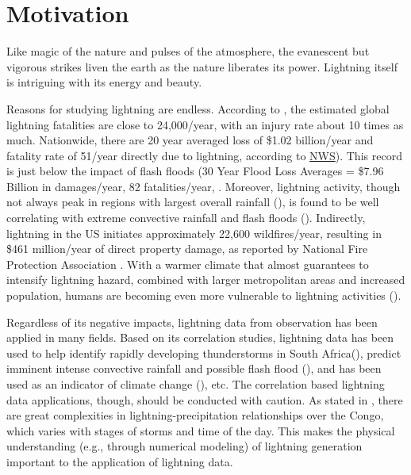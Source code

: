  
\chapter{Motivation}
\resetfootnote %

Like magic of the nature and pulses of the atmosphere, the evanescent but vigorous strikes liven the earth as the nature liberates its power. Lightning itself is intriguing with its energy and beauty. 

Reasons for studying lightning are endless. According to \cite{holle2016number}, the estimated global lightning fatalities are close to 24,000/year, with an injury rate about 10 times as much. Nationwide, there are 20 year averaged loss  of \$1.02 billion/year and fatality rate of 51/year directly due to lightning, according to \href{https://www.weather.gov/safety/lightning-fatalities}{NWS}). This record is just below the impact of flash floods (30 Year Flood Loss Averages = \$7.96 Billion in damages/year, 82 fatalities/year, \cite{nws2018}. Moreover, lightning activity, though not always peak in regions with largest overall rainfall (\cite{holle2016lightning}), is found to be well correlating with extreme convective rainfall and flash floods (\cite{price2011using,lynn2010prediction,soula2001some,carte1977lightning,tapia1998estimation}). Indirectly, lightning in the US initiates approximately 22,600 wildfires/year, resulting in \$461 million/year of direct property damage, as reported by National Fire Protection Association \cite{ahrens2013lightning}. With a warmer climate that almost guarantees to intensify lightning hazard, combined with larger metropolitan areas and increased population, humans are becoming even more vulnerable to lightning activities (\cite{yair2018lightning}).

Regardless of its negative impacts, lightning data from observation has been applied in many fields. Based on its correlation studies, lightning data has been used to help identify rapidly developing thunderstorms in South Africa(\cite{gijben2017using}), predict imminent intense convective rainfall and possible flash flood  (\cite{price2011using}), and has been used as an indicator of climate change (\cite{reeve1999lightning}), etc. The correlation based lightning data applications, though, should be conducted with caution. As stated in \cite{solimine2021relationships}, there are great complexities in lightning-precipitation relationships over the Congo, which varies with stages of storms and time of the day. This makes the physical understanding (e.g., through numerical modeling) of lightning generation important to the application of lightning data. 

